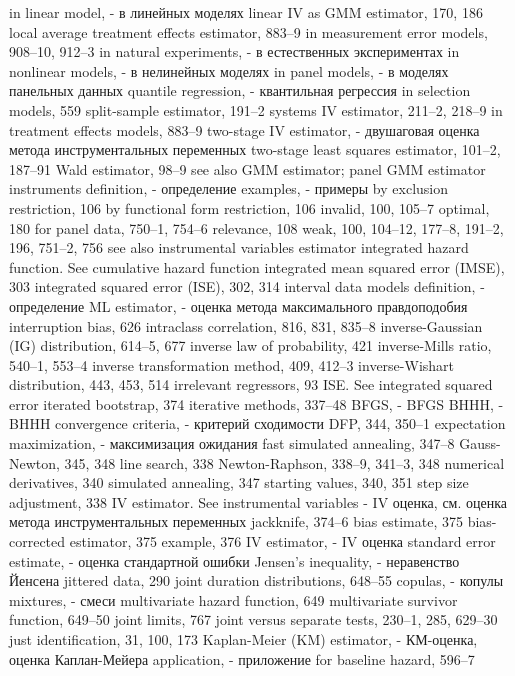 in linear model, - в линейных моделях
linear IV as GMM estimator, 170, 186
local average treatment effects estimator, 883–9 in measurement error models, 908–10, 912–3
in natural experiments, - в естественных экспериментах
in nonlinear models, - в нелинейных моделях
in panel models, - в моделях панельных данных
quantile regression, - квантильная регрессия
in selection models, 559
split-sample estimator, 191–2
systems IV estimator, 211–2, 218–9
in treatment effects models, 883–9
two-stage IV estimator, - двушаговая оценка метода инструментальных переменных
two-stage least squares estimator, 101–2, 187–91 Wald estimator, 98–9
see also GMM estimator; panel GMM estimator
instruments
definition, - определение
examples, - примеры
by exclusion restriction, 106
by functional form restriction, 106
invalid, 100, 105–7
optimal, 180
for panel data, 750–1, 754–6
relevance, 108
weak, 100, 104–12, 177–8, 191–2, 196, 751–2, 756 see also instrumental variables estimator
integrated hazard function. See cumulative hazard function
integrated mean squared error (IMSE), 303 integrated squared error (ISE), 302, 314 interval data models
definition, - определение
ML estimator, - оценка метода максимального правдоподобия
interruption bias, 626
intraclass correlation, 816, 831, 835–8 inverse-Gaussian (IG) distribution, 614–5, 677 inverse law of probability, 421
inverse-Mills ratio, 540–1, 553–4
inverse transformation method, 409, 412–3 inverse-Wishart distribution, 443, 453, 514 irrelevant regressors, 93
ISE. See integrated squared error
iterated bootstrap, 374
iterative methods, 337–48
BFGS, - BFGS
BHHH, - BHHH
convergence criteria, - критерий сходимости
DFP, 344, 350–1
expectation maximization, - максимизация ожидания
fast simulated annealing, 347–8
Gauss-Newton, 345, 348
line search, 338
Newton-Raphson, 338–9, 341–3, 348
numerical derivatives, 340
simulated annealing, 347
starting values, 340, 351
step size adjustment, 338
IV estimator. See instrumental variables - IV оценка, см. оценка метода инструментальных переменных
jackknife, 374–6
bias estimate, 375
bias-corrected estimator, 375 example, 376
IV estimator, - IV оценка
standard error estimate, - оценка стандартной ошибки
Jensen’s inequality, - неравенство Йенсена
jittered data, 290
joint duration distributions, 648–55
copulas, - копулы
mixtures, - смеси
multivariate hazard function, 649 multivariate survivor function, 649–50
joint limits, 767
joint versus separate tests, 230–1, 285, 629–30 just identification, 31, 100, 173
Kaplan-Meier (KM) estimator, - КМ-оценка, оценка Каплан-Мейера 
application, - приложение
for baseline hazard, 596–7 
